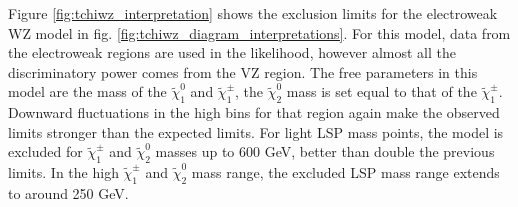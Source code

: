     Figure \ref{fig:tchiwz_interpretation} shows the exclusion limits for the electroweak WZ model in fig. \ref{fig:tchiwz_diagram_interpretations}. For this model, data from the electroweak regions are used in the likelihood, however almost all the discriminatory power comes from the VZ region. The free parameters in this model are the mass of the $\widetilde{\chi}^0_1$ and $\widetilde{\chi}^{\pm}_1$, the $\widetilde{\chi}^0_2$ mass is set equal to that of the $\widetilde{\chi}^{\pm}_1$. Downward fluctuations in the high \MET bins for that region again make the observed limits stronger than the expected limits. For light LSP mass points, the model is excluded for $\widetilde{\chi}^{\pm}_1$ and $\widetilde{\chi}^0_2$ masses up to 600 GeV, better than double the previous limits. In the high $\widetilde{\chi}^{\pm}_1$ and $\widetilde{\chi}^0_2$ mass range, the excluded LSP mass range extends to around 250 GeV. 

